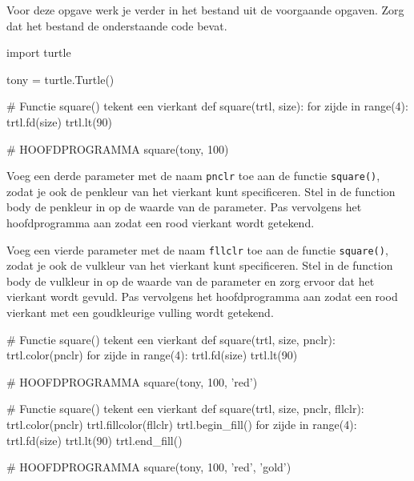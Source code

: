 \documentclass[../main]{subfiles}
\begin{document}
\begin{opgave}[icons={laptop}]
Voor deze opgave werk je verder in het bestand  uit de voorgaande opgaven. Zorg dat het bestand de onderstaande code bevat.

\begin{python}[style=mu]
import turtle

tony = turtle.Turtle()

# Functie square() tekent een vierkant
def square(trtl, size):
    for zijde in range(4):
        trtl.fd(size)
        trtl.lt(90)

# HOOFDPROGRAMMA
square(tony, 100)    
\end{python}

\begin{qlist}
\item Voeg een derde parameter met de naam \texttt{pnclr} toe aan de functie \texttt{square()}, zodat je ook de penkleur van het vierkant kunt specificeren. Stel in de function body de penkleur in op de waarde van de parameter. Pas vervolgens het hoofdprogramma aan zodat een rood vierkant wordt getekend.
\item Voeg een vierde parameter met de naam \texttt{fllclr} toe aan de functie \texttt{square()}, zodat je ook de vulkleur van het vierkant kunt specificeren. Stel in de function body de vulkleur in op de waarde van de parameter en zorg ervoor dat het vierkant wordt gevuld. Pas vervolgens het hoofdprogramma aan zodat een rood vierkant met een goudkleurige vulling wordt getekend.
\begin{center}
\end{center}
\end{qlist}
\end{opgave}
\begin{antwoord}
\begin{qlist}[leftmargin=1.5cm, labelwidth=1.5cm]
\item
\begin{python-breakable}[style=mu-noframe, firstnumber=5, aboveskip=0pt]
# Functie square() tekent een vierkant
def square(trtl, size, pnclr):
    trtl.color(pnclr)
    for zijde in range(4):
        trtl.fd(size)
        trtl.lt(90)

# HOOFDPROGRAMMA
square(tony, 100, 'red') 
\end{python-breakable}
\item
\begin{python-breakable}[style=mu, firstnumber=5, aboveskip=0pt]
# Functie square() tekent een vierkant
def square(trtl, size, pnclr, fllclr):
    trtl.color(pnclr)
    trtl.fillcolor(fllclr)
    trtl.begin_fill()
    for zijde in range(4):
        trtl.fd(size)
        trtl.lt(90)
    trtl.end_fill()

# HOOFDPROGRAMMA
square(tony, 100, 'red', 'gold') 
\end{python-breakable}
\end{qlist}
\end{antwoord}
\end{document}
